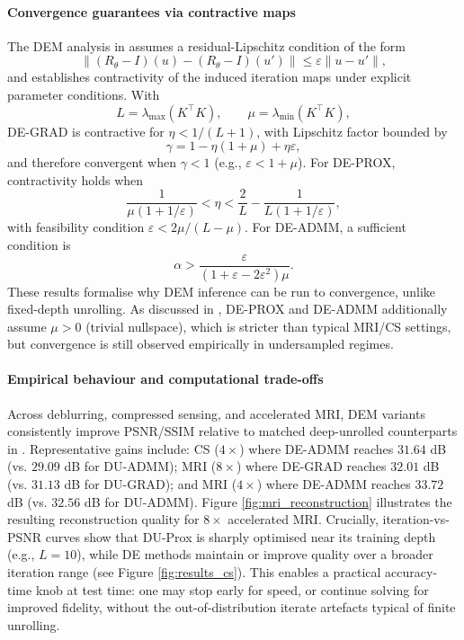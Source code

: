 \paragraph{Convergence guarantees via contractive maps}
The DEM analysis in \cite{gilton2021deep} assumes a residual-Lipschitz condition of the form
\begin{equation*}
    \|(R_\theta-I)(u)-(R_\theta-I)(u')\| \leq \varepsilon \|u-u'\|,
\end{equation*}
and establishes contractivity of the induced iteration maps under explicit parameter conditions. With
\begin{equation*}
    L=\lambda_{\max}(K^\top K), \qquad \mu=\lambda_{\min}(K^\top K),
\end{equation*}
DE-GRAD is contractive for $\eta < 1/(L+1)$, with Lipschitz factor bounded by
\begin{equation*}
    \gamma = 1-\eta(1+\mu)+\eta\varepsilon,
\end{equation*}
and therefore convergent when $\gamma<1$ (e.g., $\varepsilon<1+\mu$). For DE-PROX, contractivity holds when
\begin{equation*}
    \frac{1}{\mu(1+1/\varepsilon)} < \eta < \frac{2}{L}-\frac{1}{L(1+1/\varepsilon)},
\end{equation*}
with feasibility condition $\varepsilon < 2\mu/(L-\mu)$. For DE-ADMM, a sufficient condition is
\begin{equation*}
    \alpha > \frac{\varepsilon}{(1+\varepsilon-2\varepsilon^2)\mu}.
\end{equation*}
These results formalise why DEM inference can be run to convergence, unlike fixed-depth unrolling. As discussed in \cite{gilton2021deep}, DE-PROX and DE-ADMM additionally assume $\mu>0$ (trivial nullspace), which is stricter than typical MRI/CS settings, but convergence is still observed empirically in undersampled regimes.

\paragraph{Empirical behaviour and computational trade-offs}
Across deblurring, compressed sensing, and accelerated MRI, DEM variants consistently improve PSNR/SSIM relative to matched deep-unrolled counterparts in \cite{gilton2021deep}. Representative gains include: CS ($4\times$) where DE-ADMM reaches $31.64$ dB (vs. $29.09$ dB for DU-ADMM); MRI ($8\times$) where DE-GRAD reaches $32.01$ dB (vs. $31.13$ dB for DU-GRAD); and MRI ($4\times$) where DE-ADMM reaches $33.72$ dB (vs. $32.56$ dB for DU-ADMM). Figure \ref{fig:mri_reconstruction} illustrates the resulting reconstruction quality for $8\times$ accelerated MRI. Crucially, iteration-vs-PSNR curves show that DU-Prox is sharply optimised near its training depth (e.g., $L=10$), while DE methods maintain or improve quality over a broader iteration range (see Figure \ref{fig:results_cs}). This enables a practical accuracy-time knob at test time: one may stop early for speed, or continue solving for improved fidelity, without the out-of-distribution iterate artefacts typical of finite unrolling.

